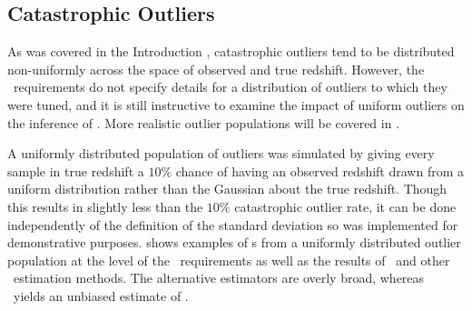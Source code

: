 \subsection{Catastrophic Outliers}

As was covered in the Introduction , catastrophic outliers tend to be distributed non-uniformly across the space of observed and true redshift.
However, the \lsst\ requirements do not specify details for a distribution of outliers to which they were tuned, and it is still instructive to examine the impact of uniform outliers on the inference of \nz.
More realistic outlier populations will be covered in .

A uniformly distributed population of outliers was simulated by giving every sample in true redshift a $10\%$ chance of having an observed redshift drawn from a uniform distribution rather than the Gaussian about the true redshift.
Though this results in slightly less than the $10\%$ catastrophic outlier rate, it can be done independently of the definition of the standard deviation so was implemented for demonstrative purposes.
 shows examples of \pzpdf s from a uniformly distributed outlier population at the level of the \lsst\ requirements as well as the results of \Chippr\ and other \nz\ estimation methods.
The alternative estimators are overly broad, whereas \Chippr\ yields an unbiased estimate of \nz.

